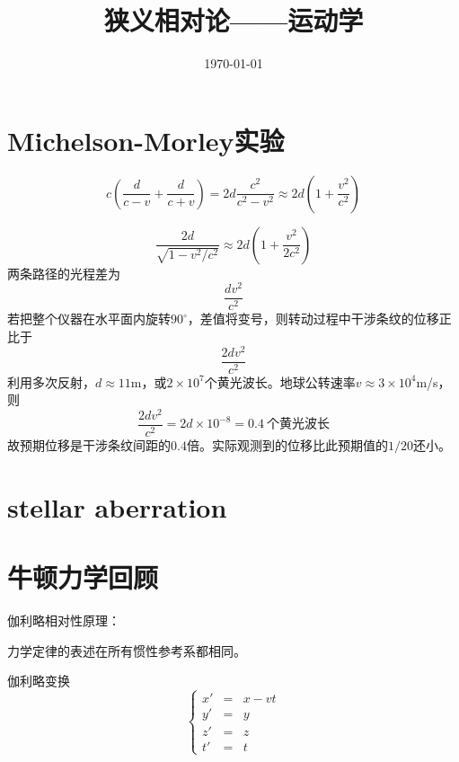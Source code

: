 \documentclass[12pt,a4paper]{article}
\title{狭义相对论——运动学}
\author{}
\date{\today}
\begin{document}
\maketitle

\section{Michelson-Morley实验}
\begin{equation}
c (\frac{d}{c-v} +\frac{d}{c+v}) = 2d \frac{c^2}{c^2-v^2} \approx 2d\left(1+\frac{v^2}{c^2} \right)
\end{equation}

\begin{equation}
\frac{2d}{\sqrt{1-v^2/c^2}} \approx 2d \left(1+\frac{v^2}{2c^2} \right)
\end{equation}
两条路径的光程差为
\begin{equation}
\frac{dv^2}{c^2}
\end{equation}
若把整个仪器在水平面内旋转$90^{\circ}$，差值将变号，则转动过程中干涉条纹的位移正比于
\begin{equation}
\frac{2dv^2}{c^2}
\end{equation}
利用多次反射，$d \approx 11$m，或$2\times 10^7$个黄光波长。地球公转速率$v \approx 3\times 10^4$m/s，则
\begin{equation}
\frac{2dv^2}{c^2} = 2d \times 10^{-8} = 0.4~ \text{个黄光波长}
\end{equation}
故预期位移是干涉条纹间距的$0.4$倍。实际观测到的位移比此预期值的$1/20$还小。

\section{stellar aberration}

\section{牛顿力学回顾}

伽利略相对性原理：

力学定律的表述在所有惯性参考系都相同。

伽利略变换
\begin{equation}
\left\{
\begin{aligned}
x' &=& x -vt \\
y' &=& y \\
z' &=& z\\
t' &=& t
\end{aligned} \right.
\end{equation}
\end{document}
